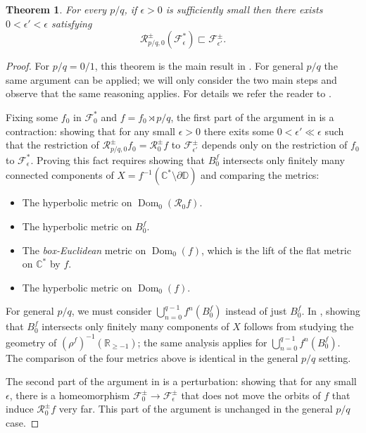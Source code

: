\documentclass[12pt,letterpaper]{amsart}
\numberwithin{equation}{section}
\newtheorem{theorem}[equation]{Theorem}
\theoremstyle{remark}
\theoremstyle{definition}
\newcommand{\sm}{\setminus}
\newcommand{\dd}{\partial}
\newcommand{\C}{\mathbb C}
\newcommand{\D}{\mathbb D}
\newcommand{\R}{\mathbb R}
\newcommand{\FF}{\mathcal F}
\newcommand{\RR}{\mathcal R}
\DeclareMathOperator{\Dom}{Dom}
\begin{document}
	\begin{theorem}\label{parabolic invariance}
		For every  $p/q$, if $\epsilon>0$ is sufficiently small then there exists $0<\epsilon'<\epsilon$ satisfying
		$$\mathcal{R}_{p/q, 0}^\pm(\mathcal{F}_\epsilon^*)\sqsubset\mathcal{F}^\pm_{\epsilon'}.$$
	\end{theorem} 
	
	\begin{proof}
		For $p/q = 0/1$, this theorem is the main result in \cite{Cheritat22}. For general $p/q$ the same argument can be applied; we will only consider the two main steps and observe that the same reasoning applies. For details we refer the reader to \cite{Cheritat22}.
		
		Fixing some $f_0$ in $\FF^*_0$ and $f = f_0\rtimes p/q$, the first part of the argument in \cite{Cheritat22} is a contraction: showing that for any small $\epsilon>0$ there exits some $0< \epsilon'\ll \epsilon$ such that
		the restriction of $\RR_{p/q, 0}^\pm f_0 = \RR_0^\pm f$ to $\FF_{\epsilon'}^\pm$ depends only on the restriction of $f_0$ to $\FF_\epsilon^*$. Proving this fact requires showing that $B_0^f$ intersects only finitely many connected components of $X = f^{-1}(\C^*\sm \dd\D)$ and comparing the metrics:
		\begin{itemize}
			\item The hyperbolic metric on $\Dom_0(\RR_0 f).$
			\item The hyperbolic metric on $B_0^f$.
			\item  The \textit{box-Euclidean} metric on $\Dom_0(f)$, which is the lift of the flat metric on $\C^*$ by $f$.
			\item The hyperbolic metric on $\Dom_0(f)$.
		\end{itemize}
		For general $p/q$, we must consider 
		$\bigcup_{n=0}^{q-1}f^n(B_0^f)$ instead of just $B_0^f$. In \cite{Cheritat22}, showing that $B_0^f$ intersects only finitely many components of $X$ follows from studying the geometry of $(\rho^f)^{-1}(\R_{\geq -1})$; the same analysis applies for $\bigcup_{n=0}^{q-1}f^n(B_0^f)$. The comparison of the four metrics above is identical in the general $p/q$ setting. 
		
		The second part of the argument in \cite{Cheritat22} is a perturbation: showing that for any small $\epsilon$,  there is a homeomorphism $\FF_0^\pm\to \FF_\epsilon^\pm$ that does not move the  
		orbits of $f$ that induce  $\RR_0^\pm f$  very far. This part of the argument is unchanged in the general $p/q$ case.
	\end{proof}
	
\end{document}
